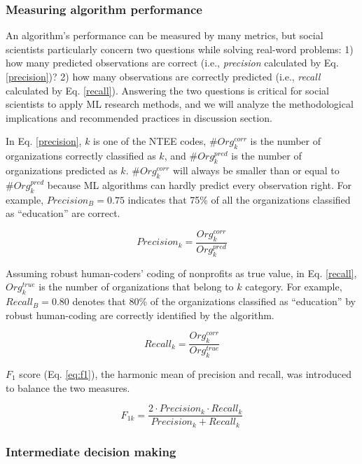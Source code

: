 \documentclass[11pt]{article}
\begin{document}
\subsubsection{Measuring algorithm performance}

An algorithm's performance can be measured by many metrics, but social scientists particularly concern two questions while solving real-word problems: 1) how many predicted observations are correct (i.e., \textit{precision} calculated by Eq. \ref{precision})? 2) how many observations are correctly predicted (i.e., \textit{recall} calculated by Eq. \ref{recall}). Answering the two questions is critical for social scientists to apply ML research methods, and we will analyze the methodological implications and recommended practices in discussion section.

In Eq. \ref{precision}, $k$ is one of the NTEE codes, $\#Org^{corr}_{k}$ is the number of organizations correctly classified as $k$, and ${\#Org^{pred}_{k}}$ is the number of organizations predicted as $k$. $\#Org^{corr}_{k}$ will always be smaller than or equal to ${\#Org^{pred}_{k}}$ because ML algorithms can hardly predict every observation right. For example, $Precision_{B}=0.75$ indicates that 75\% of all the organizations classified as ``education'' are correct.

\begin{equation} \label{precision}
    Precision_{k}=\frac{Org^{corr}_{k}}{Org^{pred}_{k}}
\end{equation}

Assuming robust human-coders' coding of nonprofits as true value, in Eq. \ref{recall}, $Org^{true}_{k}$ is the number of organizations that belong to $k$ category. For example, $Recall_{B}=0.80$ denotes that 80\% of the organizations classified as ``education'' by robust human-coding are correctly identified by the algorithm.

\begin{equation} \label{recall}
    Recall_{k}=\frac{Org^{corr}_{k}}{Org^{true}_{k}}
\end{equation}

$F_1$ score (Eq. \ref{eq:f1}), the harmonic mean of precision and recall, was introduced to balance the two measures.

\begin{equation} \label{eq:f1}
    F_{1k}=\frac{2 \cdot Precision_{k} \cdot Recall_{k}}{Precision_{k} + Recall_{k}}
\end{equation}


\subsubsection{Intermediate decision making}
\end{document}
